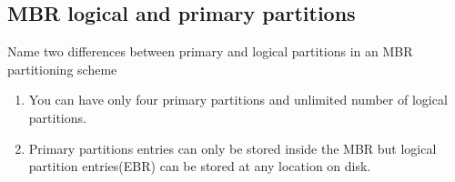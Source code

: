 \documentclass[a4paper,11pt]{article}
\theoremstyle{mytheor}
\begin{document}
\subsection{MBR logical and primary partitions}

Name two differences between primary and logical partitions in an MBR partitioning scheme

\begin{enumerate}
  \item You can have only four primary partitions and unlimited number of logical partitions.
  \item Primary partitions entries can only be stored inside the MBR but logical partition entries(EBR) can be stored at any location on disk. 
\end{enumerate}
\end{document}
